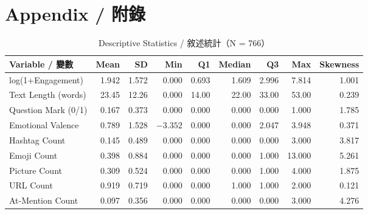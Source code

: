 \documentclass[12pt,a4paper,fontset=none]{ctexart}
\begin{document}
\newpage
\appendix
\section{Appendix / 附錄}

\begin{table}[htbp]
\centering
\caption{Descriptive Statistics / 敘述統計（N = 766）}
\label{tab:desc}
\small
\begin{tabular}{lrrrrrrrr}
\toprule
Variable / 變數 & Mean & SD & Min & Q1 & Median & Q3 & Max & Skewness \\
\midrule
log(1+Engagement) & 1.942 & 1.572 & 0.000 & 0.693 & 1.609 & 2.996 & 7.814 & 1.001 \\
Text Length (words) & 23.45 & 12.26 & 0.000 & 14.00 & 22.00 & 33.00 & 53.00 & 0.239 \\
Question Mark (0/1) & 0.167 & 0.373 & 0.000 & 0.000 & 0.000 & 0.000 & 1.000 & 1.785 \\
Emotional Valence & 0.789 & 1.528 & $-3.352$ & 0.000 & 0.000 & 2.047 & 3.948 & 0.371 \\
Hashtag Count & 0.145 & 0.489 & 0.000 & 0.000 & 0.000 & 0.000 & 3.000 & 3.817 \\
Emoji Count & 0.398 & 0.884 & 0.000 & 0.000 & 0.000 & 1.000 & 13.000 & 5.261 \\
Picture Count & 0.309 & 0.524 & 0.000 & 0.000 & 0.000 & 1.000 & 4.000 & 1.875 \\
URL Count & 0.919 & 0.719 & 0.000 & 0.000 & 1.000 & 1.000 & 2.000 & 0.121 \\
At-Mention Count & 0.097 & 0.356 & 0.000 & 0.000 & 0.000 & 0.000 & 3.000 & 4.276 \\
\bottomrule
\end{tabular}
\end{table}

\vspace{1em}
\end{document}
